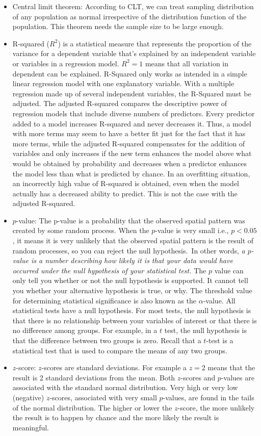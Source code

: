 \documentclass[11pt]{article}
\begin{document}
\begin{itemize}
\item Central limit theorem: According to CLT, we can treat sampling distribution of any population as normal irrespective of the distribution function of the 
population. This theorem needs the sample size to be large enough.
\item R-squared ($R^2$) is a statistical measure that represents the proportion of the variance for a dependent variable that's explained by an independent variable or variables in a regression model. $R^2 = 1$ means that all variation in dependent can be explained. R-Squared only works as intended in a simple linear regression model with one explanatory variable. With a multiple regression made up of several independent variables, the R-Squared must be adjusted.
The adjusted R-squared compares the descriptive power of regression models that include diverse numbers of predictors. Every predictor added to a model increases R-squared and never decreases it. Thus, a model with more terms may seem to have a better fit just for the fact that it has more terms, while the adjusted R-squared compensates for the addition of variables and only increases if the new term enhances the model above what would be obtained by probability and decreases when a predictor enhances the model less than what is predicted by chance. In an overfitting situation, 
an incorrectly high value of R-squared is obtained, even when the model actually has a decreased ability to predict. This is not the case with the adjusted R-squared.
\item $p$-value: The p-value is a probability that the observed spatial pattern was created by some random process. When the $p$-value is very small i.e., $ p < 0.05$, it means it is very unlikely that the observed spatial pattern is the result of random processes, so you can reject the null hypothesis.\
In other words, \emph{a $p$-value is a number describing how likely it is that your data would have occurred under the null hypothesis of your statistical test.}
The $p$ value can only tell you whether or not the null hypothesis is supported. It cannot tell you whether your alternative hypothesis is true, or why.
The threshold value for determining statistical significance is also known as the $\alpha$-value. All statistical tests have a null hypothesis. For most tests, the null hypothesis is that there is no relationship between your variables of interest or that there is no difference among groups. For example, in a $t$ test, the null hypothesis is that the difference between two groups is zero. Recall that a 
$t$-test is a statistical test that is used to compare the means of any two groups. 
\item $z$-score: $z$-scores are standard deviations. For example a $z=2$ means that the result is 2 standard deviations from the mean. 
Both $z$-scores and $p$-values are associated with the standard normal distribution. Very high or very low (negative) $z$-scores, 
associated with very small $p$-values, are found in the tails of the normal distribution. The higher or lower the $z$-score, the more unlikely the result is to happen by chance and the more likely the result is meaningful.




\end{itemize}
\end{document}
